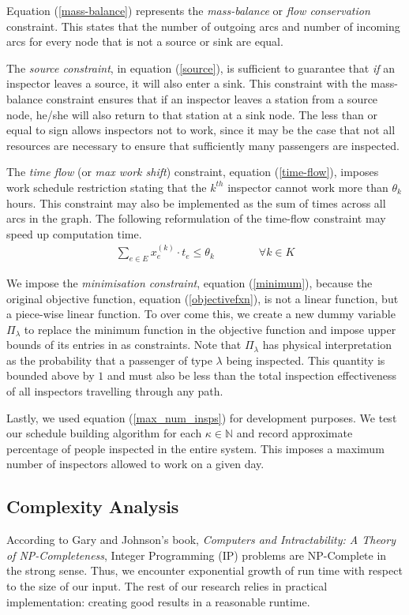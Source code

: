 \documentclass[11pt]{article}
\begin{document}
\par Equation (\ref{mass-balance}) represents the \textit{mass-balance} or \textit{flow conservation} constraint. This states that the number of outgoing arcs and number of incoming arcs for every node that is not a source or sink are equal.
\par The \textit{source constraint}, in equation (\ref{source}), is sufficient to guarantee that \textit{if} an inspector leaves a source, it will also enter a sink. This constraint with the mass-balance constraint ensures that if an inspector leaves a station from a source node, he/she will also return to that station at a sink node. The less than or equal to sign allows inspectors not to work, since it may be the case that not all resources are necessary to ensure that sufficiently many passengers are inspected.
\par The \textit{time flow} (or \textit{max work shift}) constraint, equation (\ref{time-flow}), imposes work schedule restriction stating that the $k^{th}$ inspector cannot work more than $\theta_k$ hours. This constraint may also be implemented as the sum of times across all arcs in the graph. The following reformulation of the time-flow constraint may speed up computation time.
\begin{align}
    \sum_{e\in E}x_e^{(k)}\cdot t_e\le \theta_k\qquad\qquad\forall k\in K
\end{align}
\par We impose the \textit{minimisation constraint}, equation (\ref{minimum}), because the original objective function, equation (\ref{objectivefxn}), is not a linear function, but a piece-wise linear function. To over come this, we create a new dummy variable $\Pi_\lambda$ to replace the minimum function in the objective function and impose upper bounds of its entries in as constraints. Note that $\Pi_\lambda$ has physical interpretation as the probability that a passenger of type $\lambda$ being inspected. This quantity is bounded above by $1$ and must also be less than the total inspection effectiveness of all inspectors travelling through any path.
\par Lastly, we used equation (\ref{max_num_insps}) for development purposes. We test our schedule building algorithm for each $\kappa\in\mathbb{N}$ and record approximate percentage of people inspected in the entire system. This imposes a maximum number of inspectors allowed to work on a given day.

\subsection{Complexity Analysis}
 \par According to Gary and Johnson's book, \textit{Computers and Intractability: A Theory of NP-Completeness}\cite{Garey:1990:CIG:574848}, Integer Programming (IP) problems are NP-Complete in the strong sense. Thus, we encounter exponential growth of run time with respect to the size of our input. The rest of our research relies in practical implementation: creating good results in a reasonable runtime.
\end{document}
